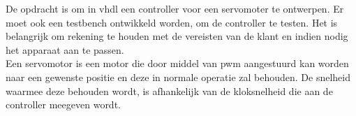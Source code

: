 De opdracht is om in \gls{vhdl} een controller voor een servomoter te ontwerpen. Er moet ook een testbench ontwikkeld worden, om de controller te testen. Het is belangrijk om rekening te houden met de vereisten van de klant en indien nodig het apparaat aan te passen.\\
Een servomotor is een motor die door middel van \gls{pwm} aangestuurd kan worden naar een gewenste positie en deze in normale operatie zal behouden. De snelheid waarmee deze behouden wordt, is afhankelijk van de kloksnelheid die aan de controller meegeven wordt.